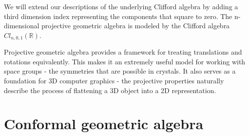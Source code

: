 We will extend our descriptions of the underlying Clifford algebra by adding a third dimension index
representing the components that square to zero. The n-dimensional projective geometric algebra is
modeled by the Clifford algebra $Cl_{n,0,1}(\mathbb{R})$.

Projective geometric algebra provides a framework for treating translations and rotations
equivalently. This makes it an extremely useful model for working with space groups - the symmetries
that are possible in crystals. It also serves as a foundation for 3D computer graphics - the
projective properties naturally describe the process of flattening a 3D object into a 2D
representation.

\section{Conformal geometric algebra}
